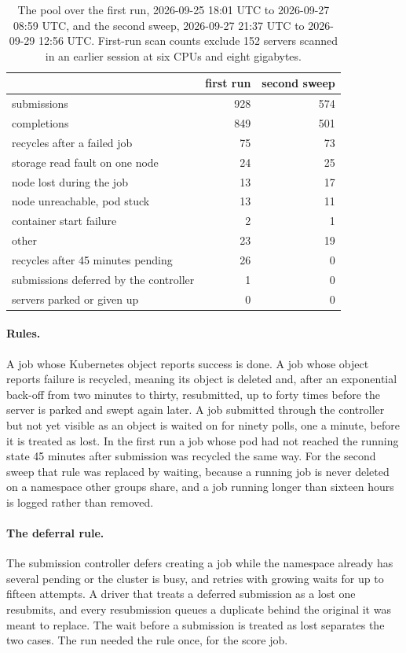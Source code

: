 \documentclass[sigconf, nonacm]{acmart}
\begin{document}
\begin{table}[t]
\caption{The pool over the first run, 2026-09-25 18:01 UTC to 2026-09-27 08:59 UTC, and the
second sweep, 2026-09-27 21:37 UTC to 2026-09-29 12:56 UTC. First-run scan counts exclude 152
servers scanned in an earlier session at six CPUs and eight gigabytes.}
\label{tab:pool}
\centering
\small
\begin{tabular}{lrr}
\toprule
 & first run & second sweep \\
\midrule
submissions & 928 & 574 \\
completions & 849 & 501 \\
recycles after a failed job & 75 & 73 \\
\quad storage read fault on one node & 24 & 25 \\
\quad node lost during the job & 13 & 17 \\
\quad node unreachable, pod stuck & 13 & 11 \\
\quad container start failure & 2 & 1 \\
\quad other & 23 & 19 \\
recycles after 45 minutes pending & 26 & 0 \\
submissions deferred by the controller & 1 & 0 \\
servers parked or given up & 0 & 0 \\
\bottomrule
\end{tabular}
\end{table}

\paragraph{Rules.} A job whose Kubernetes object reports success is done. A job whose object
reports failure is recycled, meaning its object is deleted and, after an exponential back-off from
two minutes to thirty, resubmitted, up to forty times before the server is parked and swept again
later. A job submitted through the controller but not yet visible as an object is waited on for
ninety polls, one a minute, before it is treated as lost. In the first run a job whose pod had not
reached the running state 45 minutes after submission was recycled the same way. For the second
sweep that rule was replaced by waiting, because a running job is never deleted on a namespace
other groups share, and a job running longer than sixteen hours is logged rather than removed.

\paragraph{The deferral rule.} The submission controller defers creating a job while the
namespace already has several pending or the cluster is busy, and retries with growing waits for
up to fifteen attempts. A driver that treats a deferred submission as a lost one resubmits, and every resubmission
queues a duplicate behind the original it was meant to replace. The wait before a submission is
treated as lost separates the two cases. The run needed the rule once, for the score job.
\end{document}
